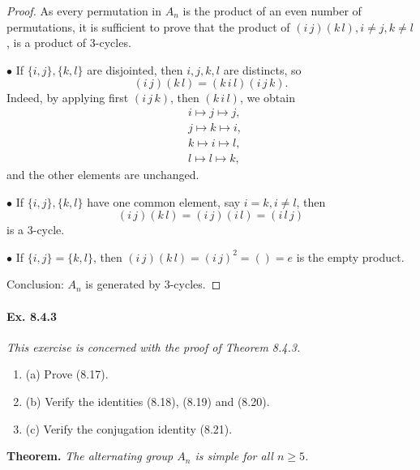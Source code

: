 \documentclass[11pt,a4paper]{article}
\newcommand{\be} {\begin{enumerate}}
\newcommand{\ee} {\end{enumerate}}
\begin{document}
\begin{proof}
As every permutation in  $A_n$ is the product of an even number of permutations, it is sufficient to prove that the product of $(i \, j)(k \, l), i\neq j, k \neq l$, is a product of 3-cycles.

$\bullet$ If $\{i,j\} ,\{k,l\}$ are disjointed, then $i,j,k,l$ are distincts, so $$(i\, j)(k\, l) = (k\, i\,l) (i \,j\, k).$$ 
Indeed, by applying first $(i\, j\, k)$, then $(k\, i\, l)$, we obtain
\begin{align*}
& i \mapsto j \mapsto j,\\
& j \mapsto k \mapsto i,\\
&k \mapsto i \mapsto l,\\
&l \mapsto l \mapsto k,
\end{align*}
and the other elements are unchanged.

$\bullet$ If $\{i,j\} ,\{k,l\}$ have one common element, say $i = k, i \neq l$, then $$(i\, j)(k\, l) = (i\, j)(i \,l) = (i \,l \,j)$$ is a  3-cycle.

$\bullet$ If $\{i,j\} = \{k, l\}$, then $(i\,j)(k\,l) = (i \,j)^2 = ()= e$ is the empty product.

Conclusion: $A_n$ is generated by 3-cycles.
\end{proof}

\paragraph{Ex. 8.4.3}

{\it This exercise is concerned with the proof of Theorem 8.4.3.
\be
\item[(a)] Prove (8.17).
\item[(b)] Verify the identities (8.18), (8.19) and (8.20).
\item[(c)] Verify the conjugation identity (8.21).
\ee
}


{\bf Theorem.} {\it The alternating group $A_n$ is simple for all $n\geq 5$.}
\end{document}
